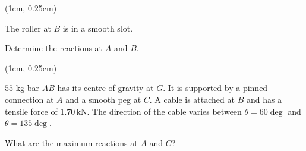 \documentclass[9pt, xcolor={svgnames, x11names},professionalfonts]{beamer}
\def\scale{1}
\begin{document}
\begin{frame}
	\begin{textblock*}{1\textwidth}(1cm, 0.25cm)

		\begin{myexam}{}{}
			\def\scale{1}
			\centering
			
		\end{myexam}
	\end{textblock*}

\end{frame}

\begin{frame}{}
	\begin{myexam}{}{}
		\def\scale{0.55}
		
		\parb\centering
		The roller at $B$ is in a smooth slot.\par
		Determine the reactions at $A$ and $B$.
	\end{myexam}
\end{frame}

\begin{frame}
	\begin{textblock*}{1\textwidth}(1cm, 0.25cm)

		\begin{myexam}{}{}
			\def\scale{0.75}
			\centering
			
			\parm
			
			$55$-kg bar $AB$ has its centre of gravity at $G$. It is supported by a pinned connection at $A$ and a smooth peg at $C$. A cable is attached at $B$ and has a tensile force of $1.70\,$kN. The direction of the cable varies between $\theta=60\deg$ and $\theta=135\deg$. \parm

			What are the maximum reactions at $A$ and $C$?\parb
			
		\end{myexam}
	\end{textblock*}
\end{frame}
\end{document}
